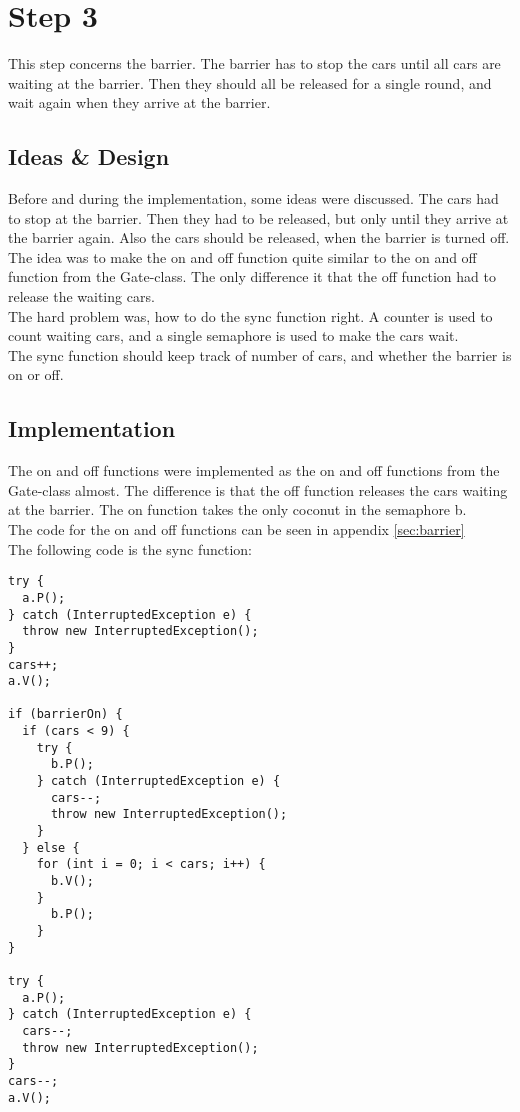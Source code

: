 \section{Step 3}
This step concerns the barrier. The barrier has to stop the cars until all cars are waiting at the barrier. Then they should all be released for a single round, and wait again when they arrive at the barrier.

\subsection{Ideas \& Design}
Before and during the implementation, some ideas were discussed. The cars had to stop at the barrier. Then they had to be released, but only until they arrive at the barrier again. Also the cars should be released, when the barrier is turned off. \\
The idea was to make the on and off function quite similar to the on and off function from the Gate-class. The only difference it that the off function had to release the waiting cars.\\ 
The hard problem was, how to do the sync function right. A counter is used to count waiting cars, and a single semaphore is used to make the cars wait. \\
The sync function should keep track of number of cars, and whether the barrier is on or off.

\subsection{Implementation}
The on and off functions were implemented as the on and off functions from the Gate-class almost. The difference is that the off function releases the cars waiting at the barrier. The on function takes the only coconut in the semaphore b.\\
The code for the on and off functions can be seen in appendix \ref{sec:barrier}
\\

The following code is the sync function:
\begin{lstlisting}
try {
  a.P();
} catch (InterruptedException e) {
  throw new InterruptedException();
}
cars++;
a.V();

if (barrierOn) {
  if (cars < 9) {
    try {
      b.P();
    } catch (InterruptedException e) {
      cars--;
      throw new InterruptedException();
    }
  } else {
    for (int i = 0; i < cars; i++) {
      b.V();
    }
      b.P();
    }
}

try {
  a.P();
} catch (InterruptedException e) {
  cars--;
  throw new InterruptedException();
}
cars--;
a.V();
\end{lstlisting}
\vspace{.8cm}

